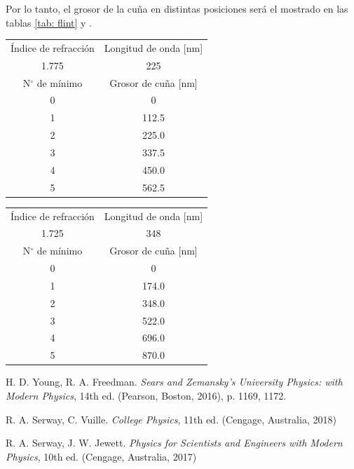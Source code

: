 \documentclass[a4paper,12pt]{article}
\newenvironment{Figure}
  {\par\medskip\noindent\minipage{\linewidth}}
  {\endminipage\par\medskip}
\begin{document}
    Por lo tanto, el grosor de la cuña en distintas posiciones será el mostrado en las tablas \ref{tab: flint} y .

    \begin{Figure}
        \centering

        \begin{tabular}{c|c}
            Índice de refracción & Longitud de onda [nm]\\
            1.775 & 225 \\
            \midrule
            N$^\circ$ de mínimo & Grosor de cuña [nm] \\
            0 & 0 \\
            1 & 112.5 \\
            2 & 225.0 \\
            3 & 337.5 \\
            4 & 450.0 \\
            5 & 562.5 \\
        \end{tabular}

        \label{tab: flint}
    \end{Figure}

    \begin{Figure}
        \centering

        \begin{tabular}{c|c}
            \toprule
            Índice de refracción & Longitud de onda [nm]\\
            1.725 & 348 \\
            \midrule
            N$^\circ$ de mínimo & Grosor de cuña [nm] \\
            0 & 0 \\
            1 & 174.0 \\
            2 & 348.0 \\
            3 & 522.0 \\
            4 & 696.0 \\
            5 & 870.0 \\
        \end{tabular}

        \label{tab: flint2}
    \begin{Figure}

\begin{thebibliography}{99}

 H. D. Young, R. A. Freedman. \emph{Sears and Zemansky's University Physics: with Modern Physics}, 14th ed. (Pearson, Boston, 2016), p. 1169, 1172.

\bibitem{} R. A. Serway, C. Vuille. \emph{College Physics}, 11th ed. (Cengage, Australia, 2018)

\bibitem{} R. A. Serway, J. W. Jewett. \emph{Physics for Scientists and Engineers with Modern Physics}, 10th ed. (Cengage, Australia, 2017)

\end{thebibliography}
\end{document}
